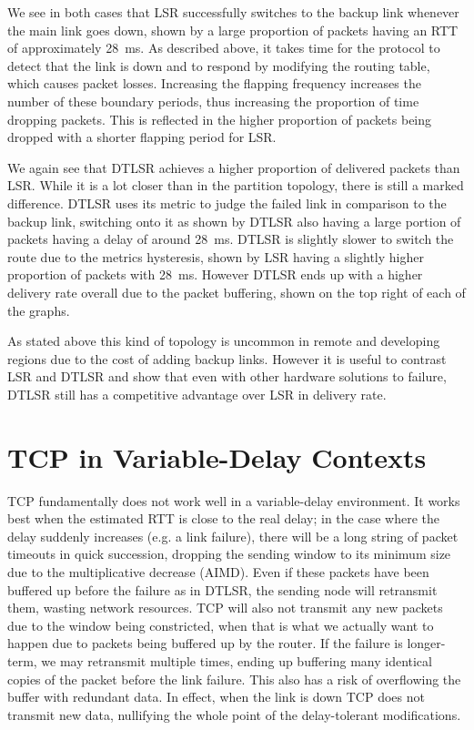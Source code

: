 \documentclass[withindex,glossary,openany]{cam-thesis}
\begin{document}
We see in both cases that LSR successfully switches to the backup link whenever the main link goes down, shown by a large proportion of packets having an RTT of approximately \SI{28}{\ms}. As described above, it takes time for the protocol to detect that the link is down and to respond by modifying the routing table, which causes packet losses. Increasing the flapping frequency increases the number of these boundary periods, thus increasing the proportion of time dropping packets. This is reflected in the higher proportion of packets being dropped with a shorter flapping period for LSR.

We again see that DTLSR achieves a higher proportion of delivered packets than LSR. While it is a lot closer than in the partition topology, there is still a marked difference. DTLSR uses its metric to judge the failed link in comparison to the backup link, switching onto it as shown by DTLSR also having a large portion of packets having a delay of around \SI{28}{\ms}. DTLSR is slightly slower to switch the route due to the metrics hysteresis, shown by LSR having a slightly higher proportion of packets with \SI{28}{\ms}. However DTLSR ends up with a higher delivery rate overall due to the packet buffering, shown on the top right of each of the graphs.

As stated above this kind of topology is uncommon in remote and developing regions due to the cost of adding backup links. However it is useful to contrast LSR and DTLSR and show that even with other hardware solutions to failure, DTLSR still has a competitive advantage over LSR in delivery rate.

\section{TCP in Variable-Delay Contexts}

TCP fundamentally does not work well in a variable-delay environment. It works best when the estimated RTT is close to the real delay; in the case where the delay suddenly increases (e.g. a link failure), there will be a long string of packet timeouts in quick succession, dropping the sending window to its minimum size due to the multiplicative decrease (AIMD). Even if these packets have been buffered up before the failure as in DTLSR, the sending node will retransmit them, wasting network resources. TCP will also not transmit any new packets due to the window being constricted, when that is what we actually want to happen due to packets being buffered up by the router. If the failure is longer-term, we may retransmit multiple times, ending up buffering many identical copies of the packet before the link failure. This also has a risk of overflowing the buffer with redundant data. In effect, when the link is down TCP does not transmit new data, nullifying the whole point of the delay-tolerant modifications.
\end{document}
